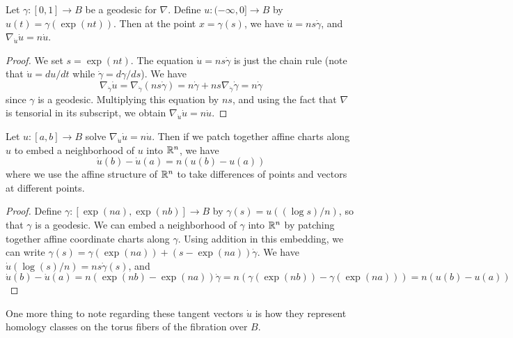 \documentclass[12pt]{amsart}
\begin{document}
\begin{lemma}
  Let $\gamma: [0,1] \to B$ be a geodesic for $\nabla$. Define $u :
  (-\infty,0] \to B$ by $u(t) = \gamma(\exp(nt))$. Then at the point
  $x = \gamma(s)$, we have $\dot{u} = ns\dot{\gamma}$, and
  $\nabla_{\dot{u}} \dot{u} = n\dot{u}$.
\end{lemma}
\begin{proof}
  We set $s = \exp(nt)$. The equation $\dot{u} = ns\dot{\gamma}$ is just
  the chain rule (note that $\dot{u} = du/dt$ while $\dot{\gamma} =
  d\gamma/ds$). We have
  \begin{equation}
    \nabla_{\dot{\gamma}} \dot{u} = \nabla_{\dot{\gamma}} (ns\dot{\gamma}) = n\dot{\gamma}
    + ns\nabla_{\dot{\gamma}}\dot{\gamma} = n\dot{\gamma}
  \end{equation}
  since $\gamma$ is a geodesic. Multiplying this equation by $ns$, and
  using the fact that $\nabla$ is tensorial in its subscript, we
  obtain $\nabla_{\dot{u}} \dot{u} = n\dot{u}$.
\end{proof}

\begin{lemma}
\label{lem:differences}
  Let $u: [a,b] \to B$ solve $\nabla_{\dot{u}}\dot{u} =
  n\dot{u}$. Then if we patch together affine charts along $u$ to embed a
  neighborhood of $u$ into $\mathbb{R}^n$, we have
  \begin{equation}
    \dot{u}(b) - \dot{u}(a) = n(u(b)-u(a))
  \end{equation}
  where we use the affine structure of $\mathbb{R}^n$ to take differences of
  points and vectors at different points.
\end{lemma}
\begin{proof}
  Define $\gamma: [\exp(na),\exp(nb)] \to B$ by $\gamma(s) = u((\log
  s)/n)$, so that $\gamma$ is a geodesic. We can embed a neighborhood
  of $\gamma$ into $\mathbb{R}^n$ by patching together affine coordinate
  charts along $\gamma$. Using addition in this embedding, we can
  write $\gamma(s) = \gamma(\exp(na)) + (s-\exp(na))\dot{\gamma}$. We
  have $\dot{u}(\log(s)/n) = ns\dot{\gamma}(s)$, and
  \begin{equation}
    \dot{u}(b) - \dot{u}(a) =n(\exp(nb)-\exp(na))\dot{\gamma} =
    n(\gamma(\exp(nb)) - \gamma(\exp(na))) = n(u(b)-u(a))
  \end{equation}
\end{proof}

One more thing to note regarding these tangent vectors $\dot{u}$ is
how they represent homology classes on the torus fibers of the
fibration over $B$.
\end{document}
